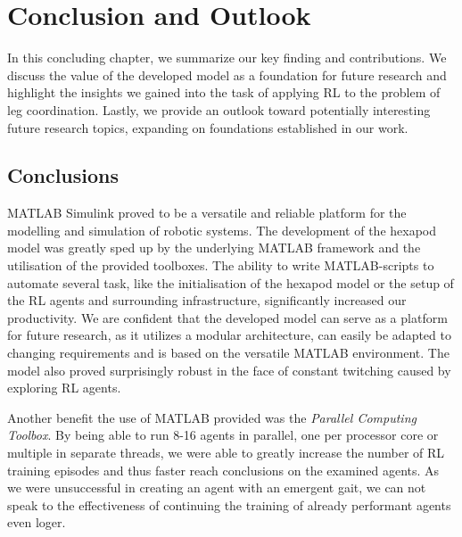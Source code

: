 \chapter{Conclusion and Outlook}
\label{ch:conclusion}

In this concluding chapter, we summarize our key finding and contributions.
We discuss the value of the developed model as a foundation for future research and highlight the insights we gained into the task of applying RL to the problem of leg coordination.
Lastly, we provide an outlook toward potentially interesting future research topics, expanding on foundations established in our work.

\section{Conclusions}

MATLAB Simulink proved to be a versatile and reliable platform for the modelling and simulation of robotic systems.
The development of the hexapod model was greatly sped up by the underlying MATLAB framework and the utilisation of the provided toolboxes.
The ability to write MATLAB-scripts to automate several task, like the initialisation of the hexapod model or the setup of the RL agents and surrounding infrastructure, significantly increased our productivity.
We are confident that the developed model can serve as a platform for future research, as it utilizes a modular architecture, can easily be adapted to changing requirements and is based on the versatile MATLAB environment.
The model also proved surprisingly robust in the face of constant twitching caused by exploring RL agents.

Another benefit the use of MATLAB provided was the \textit{Parallel Computing Toolbox}. 
By being able to run 8-16 agents in parallel, one per processor core or multiple in separate threads, we were able to greatly increase the number of RL training episodes and thus faster reach conclusions on the examined agents.
As we were unsuccessful in creating an agent with an emergent gait, we can not speak to the effectiveness of continuing the training of already performant agents even loger.

